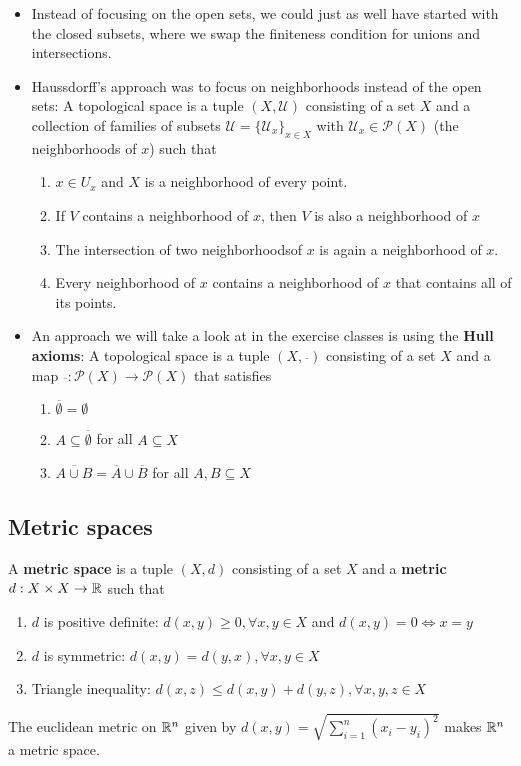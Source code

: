 \begin{itemize}
  \item Instead of focusing on the open sets, we could just as well have started with the closed subsets, where we swap the finiteness condition for unions and intersections.
  \item Haussdorff's approach was to focus on neighborhoods instead of the open sets: A topological space is a tuple $(X,\mathcal{U})$ consisting of a set $X$ and a collection of families of subsets $\mathcal{U} = \{\mathcal{U}_x\}_{x \in X}$ with $\mathcal{U}_x \in \mathcal{P}(X)$ (the neighborhoods of $x$) such that
    \begin{enumerate}
      \item $x \in U_x$ and $X$ is a neighborhood of every point.
      \item If $V$ contains a neighborhood of $x$, then $V$ is also a neighborhood of $x$
      \item The intersection of two neighborhoodsof $x$ is again a neighborhood of $x$.
      \item Every neighborhood of $x$ contains a neighborhood of $x$ that contains all of its points.
    \end{enumerate}
  \item An approach we will take a look at in the exercise classes is using the \textbf{Hull axioms}: A topological space is a tuple $(X, \overline{\phantom{ }})$ consisting of a set $X$ and a map $\overline{\phantom{}}: \mathcal{P}(X) \to  \mathcal{P}(X)$ that satisfies
    \begin{enumerate}
      \item $\overline{\emptyset} = \emptyset$
      \item $A \subseteq \overline{\emptyset}$ for all $A \subseteq X$
      \item $\overline{A \cup B} = \overline{A} \cup \overline{B}$ for all $A,B \subseteq X$
    \end{enumerate}
\end{itemize}


\subsection{Metric spaces}

\begin{dfn}[]
  A \textbf{metric space} is a tuple $(X,d)$ consisting of a set $X$ and a \textbf{metric} $d: X \times X \to \mathbb{R}$ such that
  \begin{enumerate}
    \item $d$ is positive definite: $d(x,y) \geq 0, \forall x,y \in X$ and $d(x,y)= 0 \iff x = y$
    \item $d$ is symmetric: $d(x,y) = d(y,x), \forall x,y \in X$
    \item Triangle inequality: $d(x,z) \leq d(x,y) + d(y,z), \forall x,y,z \in X$
  \end{enumerate}
\end{dfn}
The euclidean metric on $\mathbb{R}^{n}$ given by $d(x,y) = \sqrt{\sum_{i=1}^{n}(x_i - y_i)^{2}}$ makes $\mathbb{R}^n$ a metric space.

